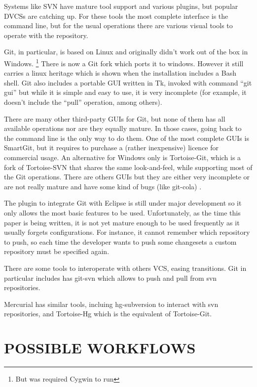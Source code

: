 \documentclass[a4paper,10pt]{article}
\begin{document}
Systems like SVN have mature tool support and various plugins, but popular DVCSs are catching up.
For these tools the most complete interface is the command line, but for the usual operations
there are various visual tools to operate with the repository.

Git, in particular, is based on Linux and originally didn't work out of the box in Windows. \footnote{But was required Cygwin to run}
There is now a Git fork which ports it to windows. However it still carries a linux heritage which is shown when the installation includes a Bash shell.
Git also includes a portable GUI written in Tk, invoked with command ``git gui'' 
but while it is simple and easy to use, it is very incomplete (for example, 
it doesn't include the ``pull'' operation, among others).

There are many other third-party GUIs for Git, but none of them has all available operations nor are they equally mature. 
In those cases, going back to the command line is the only way to do them. One of the most complete GUIs is SmartGit, but 
it requires to purchase a (rather inexpensive) licence for commercial usage. An alternative for Windows only 
is Tortoise-Git, which is a fork of Tortoise-SVN that shares the same look-and-feel, while supporting most of the 
Git operations. There are others GUIs but they are either very incomplete or are not really mature and have 
some kind of bugs (like git-cola) \cite{interfaces}.

The plugin to integrate Git with Eclipse is still under major development so it only allows the most basic features to be used.
Unfortunately, as the time this paper is being written, it is not yet mature enough to be used frequently as it usually forgets configurations. For instance, it cannot remember which repository to push, so each time the developer wants to push some changesets a custom repository must be specified again.

There are some tools to interoperate with others VCS, easing transitions.
Git in particular includes has git-svn which allows to push and pull from svn repositories.

Mercurial has similar tools, incluing hg-subversion to interact with svn repositories, and Tortoise-Hg which is
the equivalent of Tortoise-Git.

\section{POSSIBLE WORKFLOWS}
\label{WORKFLOWS}
\end{document}
